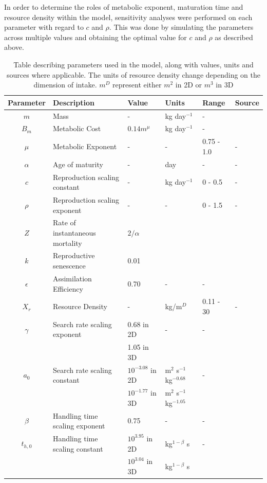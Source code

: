 \documentclass[a4paper, 11pt, hidelinks]{article} %
\begin{document}
	In order to determine the roles of metabolic exponent, maturation time and resource density within the model, sensitivity analyses were performed on each parameter with regard to $c$ and $\rho$.  This was done by simulating the parameters across multiple values and obtaining the optimal value for $c$ and $\rho$ as described above.
	
	
	\begin{centering}
		
		
		\begin{table}[h!]
			\caption{Table describing parameters used in the model, along with values, units and sources where applicable.  The units of resource density change depending on the dimension of intake.  $m^D$ represent either $m^2$ in 2D or $m^3$ in 3D} 
			\label{parameters}
			\vspace{2mm}
			\begin{tabular}{c l l l l p{3cm}}
				\hline
				Parameter 	& Description 			& Value 	& Units 	& Range 		& Source \\
				\hline
				$m$			& Mass					& -			& kg day$^{-1}$& -			&		\\
				
				$B_m$		& Metabolic Cost		& $0.14 m^{\mu}$ & kg day$^{-1}$& - 	& \cite{Peters1983}\\
				$\mu$		& Metabolic Exponent	& -			&	-		& 0.75 - 1.0	& - \\
				$\alpha$	& Age of maturity		& -     	& day		& -				& -\\
				$c$			& Reproduction scaling constant & - & kg day$^{-1}$& 0 - 0.5 		& -\\
				$\rho$		& Reproduction scaling exponent	& -	&	-		& 0 - 1.5			& -\\
				$Z$			& Rate of instantaneous mortality& $2/\alpha$	& & & \cite{Charnov2001}\\%
				$k$			& Reproductive senescence & 0.01\\
				
				$\epsilon$	& Assimilation Efficiency & 0.70 & - & - 		& \cite{Peters1983} \\
				$X_r$ 		& Resource Density		& -		& kg/m$^D$		& 0.11 - 30				& -\\
				$\gamma$	& Search rate scaling exponent & 0.68 in 2D	& - & - & \cite{Pawar2012} \\
				&						& 1.05 in 3D\\
				$a_0$		& Search rate scaling constant & $10^{-3.08}$ in 2D & m$^2$ s$^{-1}$ kg$^{-0.68}$   & - &\cite{Pawar2012}	\\
				&						& $10^{-1.77}$ in 3D& m$^2$ s$^{-1}$ kg$^{-1.05} $\\
				$\beta$		& Handling time scaling exponent& 0.75 & - & - & \cite{Pawar2012}\\
				$t_{h, 0}$	& Handling time scaling constant& $10^{3.95}$ in 2D &kg$^{1-\beta}$ s& -& \cite{Pawar2012}	\\
				&						& $10^{3.04}$ in 3D			&kg$^{1-\beta}$ s\\
				\hline
			\end{tabular}
		\end{table}
	\end{centering}
\end{document}
